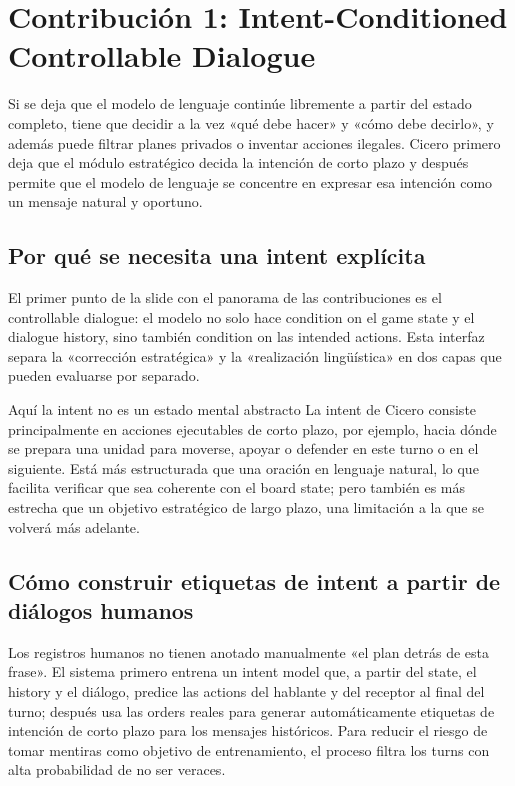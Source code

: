\section{Contribución 1: Intent-Conditioned Controllable Dialogue}

Si se deja que el modelo de lenguaje continúe libremente a partir del estado completo, tiene que decidir a la vez «qué debe hacer» y «cómo debe decirlo», y además puede filtrar planes privados o inventar acciones ilegales. Cicero primero deja que el módulo estratégico decida la intención de corto plazo y después permite que el modelo de lenguaje se concentre en expresar esa intención como un mensaje natural y oportuno.

\subsection{Por qué se necesita una intent explícita}

El primer punto de la slide con el panorama de las contribuciones es el controllable dialogue: el modelo no solo hace condition on el game state y el dialogue history, sino también condition on las intended actions. Esta interfaz separa la «corrección estratégica» y la «realización lingüística» en dos capas que pueden evaluarse por separado.


\begin{knowledgebox}{Aquí la intent no es un estado mental abstracto}
La intent de Cicero consiste principalmente en acciones ejecutables de corto plazo, por ejemplo, hacia dónde se prepara una unidad para moverse, apoyar o defender en este turno o en el siguiente. Está más estructurada que una oración en lenguaje natural, lo que facilita verificar que sea coherente con el board state; pero también es más estrecha que un objetivo estratégico de largo plazo, una limitación a la que se volverá más adelante.
\end{knowledgebox}

\subsection{Cómo construir etiquetas de intent a partir de diálogos humanos}

Los registros humanos no tienen anotado manualmente «el plan detrás de esta frase». El sistema primero entrena un intent model que, a partir del state, el history y el diálogo, predice las actions del hablante y del receptor al final del turno; después usa las orders reales para generar automáticamente etiquetas de intención de corto plazo para los mensajes históricos. Para reducir el riesgo de tomar mentiras como objetivo de entrenamiento, el proceso filtra los turns con alta probabilidad de no ser veraces.


